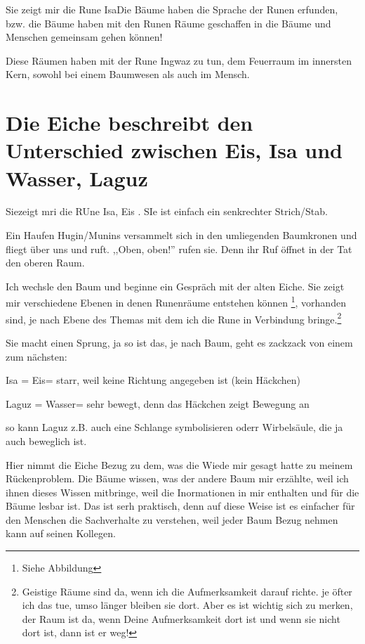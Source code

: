 \documentclass[11pt,titlepage,a5paper]{book}
\begin{document}
Sie zeigt mir die Rune IsaDie Bäume haben die Sprache der Runen erfunden, bzw. die Bäume haben mit den Runen Räume geschaffen in die Bäume und Menschen gemeinsam gehen können!

Diese Räumen haben mit der Rune Ingwaz \textarc{[\withlines]\ng} zu tun, dem Feuerraum im innersten Kern, sowohl bei einem Baumwesen als auch im Mensch.

\section{Die Eiche beschreibt den Unterschied zwischen Eis, Isa  und Wasser, Laguz  }

Siezeigt mri die RUne Isa, Eis . SIe ist einfach ein senkrechter Strich/Stab.

Ein Haufen Hugin/Munins versammelt sich in den umliegenden Baumkronen und fliegt über uns und ruft. ,,Oben, oben!'' rufen sie. Denn ihr Ruf öffnet in der Tat den oberen Raum.

Ich wechsle den Baum und beginne ein Gespräch mit der alten Eiche. Sie zeigt mir verschiedene Ebenen in denen Runenräume entstehen können \footnote{Siehe Abbildung}, vorhanden sind, je nach Ebene des Themas mit dem ich die Rune in Verbindung bringe.\footnote{Geistige Räume sind da, wenn ich die Aufmerksamkeit darauf richte. je öfter ich das tue, umso länger bleiben sie dort. Aber es ist wichtig sich zu merken, der Raum ist da, wenn Deine Aufmerksamkeit dort ist und wenn sie nicht dort ist, dann ist er weg!}

Sie macht einen Sprung, ja so ist das, je nach Baum, geht es zackzack von einem zum nächsten:

 Isa = Eis= starr, weil keine Richtung angegeben ist (kein Häckchen)

Laguz = Wasser= sehr bewegt, denn das Häckchen zeigt Bewegung an

so kann Laguz  z.B. auch eine Schlange symbolisieren oderr Wirbelsäule, die ja auch beweglich ist.

Hier nimmt die Eiche Bezug zu dem, was die Wiede mir gesagt hatte zu meinem Rückenproblem. Die Bäume wissen, was der andere Baum mir erzählte, weil ich ihnen dieses Wissen mitbringe, weil die Inormationen in mir enthalten und für die Bäume lesbar ist. Das ist serh praktisch, denn auf diese Weise ist es einfacher für den Menschen die Sachverhalte zu verstehen, weil jeder Baum Bezug nehmen kann auf seinen Kollegen.
\end{document}

